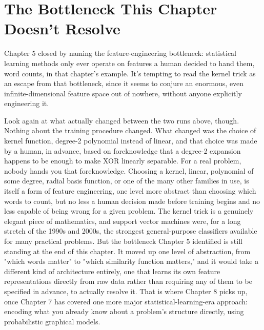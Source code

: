 \section*{The Bottleneck This Chapter Doesn't Resolve}

Chapter 5 closed by naming the feature-engineering bottleneck: statistical learning methods only ever operate on features a human decided to hand them, word counts, in that chapter's example. It's tempting to read the kernel trick as an escape from that bottleneck, since it seems to conjure an enormous, even infinite-dimensional feature space out of nowhere, without anyone explicitly engineering it.

Look again at what actually changed between the two runs above, though. Nothing about the training procedure changed. What changed was the choice of kernel function, degree-2 polynomial instead of linear, and that choice was made by a human, in advance, based on foreknowledge that a degree-2 expansion happens to be enough to make XOR linearly separable. For a real problem, nobody hands you that foreknowledge. Choosing a kernel, linear, polynomial of some degree, radial basis function, or one of the many other families in use, is itself a form of feature engineering, one level more abstract than choosing which words to count, but no less a human decision made before training begins and no less capable of being wrong for a given problem. The kernel trick is a genuinely elegant piece of mathematics, and support vector machines were, for a long stretch of the 1990s and 2000s, the strongest general-purpose classifiers available for many practical problems. But the bottleneck Chapter 5 identified is still standing at the end of this chapter. It moved up one level of abstraction, from "which words matter" to "which similarity function matters," and it would take a different kind of architecture entirely, one that learns its own feature representations directly from raw data rather than requiring any of them to be specified in advance, to actually resolve it. That is where Chapter 8 picks up, once Chapter 7 has covered one more major statistical-learning-era approach: encoding what you already know about a problem's structure directly, using probabilistic graphical models.
